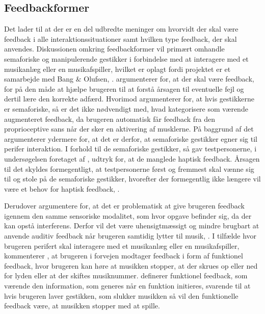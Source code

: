 \subsection{Feedbackformer}
\label{Feedbackformer}
%
Det lader til at der er en del udbredte meninger om hvorvidt der skal være feedback i alle interaktionssituationer samt hvilken type feedback, der skal anvendes. Diskussionen omkring feedbackformer vil primært omhandle semaforiske og manipulerende gestikker i forbindelse med at interagere med et musikanlæg eller en musikafspiller, hvilket er oplagt fordi projektet er et samarbejde med Bang $\&$ Olufsen, . \blankline
%
\textcite[s. 10]{PDF:NaturalUserInterfaces} argumenterer for, at der skal være feedback, for på den måde at hjælpe brugeren til at forstå årsagen til eventuelle fejl og dertil lære den korrekte adfærd. Hvorimod \textcite[s. 16]{PDF:PIEmbeddingHCIOnTheRelevance} argumenterer for, at hvis gestikkerne er semaforiske, så er det ikke nødvendigt med, hvad \textcite[s. 16]{PDF:PIEmbeddingHCIOnTheRelevance} kategorisere som værende augmenteret feedback, da brugeren automatisk får feedback fra den proprioceptive sans når der sker en aktivering af musklerne. På baggrund af det argumenterer \textcite[s. 16]{PDF:PIEmbeddingHCIOnTheRelevance} ydermere for, at det er derfor, at semaforiske gestikker egner sig til perifer interaktion. I forhold til de semaforiske gestikker, så gav testpersonerne, i undersøgelsen foretaget af \textcite[ss. 172-173]{PDF:ComparingInputModalities}, udtryk for, at de manglede haptisk feedback. Årsagen til det skyldes formegentligt, at testpersonerne først og fremmest skal vænne sig til og stole på de semaforiske gestikker, hvorefter der formegentlig ikke længere vil være et behov for haptisk feedback, \parencite[s. 174]{PDF:ComparingInputModalities}. 

Derudover argumentere \textcite[s. 3]{PDF:FacilitatingPIDesignAndEvaluation} for, at det er problematisk at give brugeren feedback igennem den samme sensoriske modalitet, som hvor opgave befinder sig, da der kan opstå interferens. Derfor vil det være uhensigtmæssigt og mindre brugbart at anvende auditiv feedback når brugeren samtidig lytter til musik, \parencite[s. 3]{PDF:FacilitatingPIDesignAndEvaluation}. I tilfælde hvor brugeren perifert skal interagere med et musikanlæg eller en musikafspiller, kommenterer \textcite[s. 19]{PDF:PIEmbeddingHCIOnTheRelevance}, at brugeren i forvejen modtager feedback i form af funktionel feedback, hvor brugeren kan høre at musikken stopper, at der skrues op eller ned for lyden eller at der skiftes musiknummer. \textcite[s. 3]{PDF:InteractionFrogger} definerer funktionel feedback, som værende den information, som generes når en funktion initieres, svarende til at hvis brugeren laver gestikken, som slukker musikken så vil den funktionelle feedback være, at musikken stopper med at spille. 

